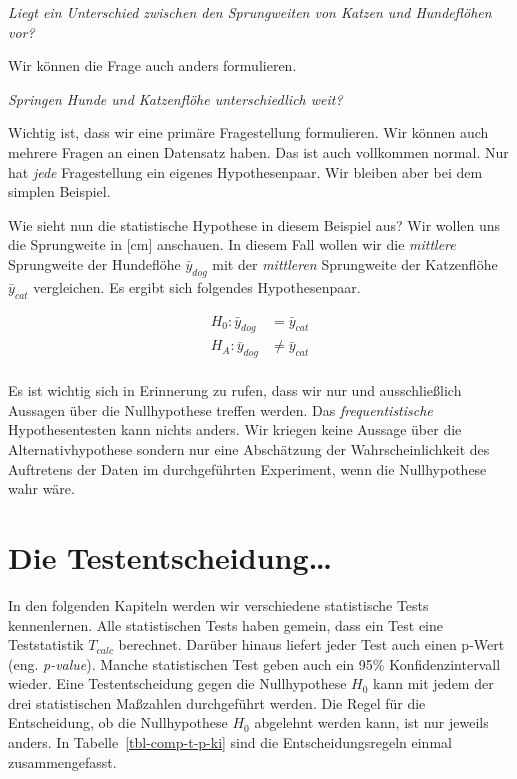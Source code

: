 \documentclass[
  letterpaper,
]{scrbook}
\begin{document}
\emph{Liegt ein Unterschied zwischen den Sprungweiten von Katzen und
Hundeflöhen vor?}

Wir können die Frage auch anders formulieren.

\emph{Springen Hunde und Katzenflöhe unterschiedlich weit?}

Wichtig ist, dass wir eine primäre Fragestellung formulieren. Wir können
auch mehrere Fragen an einen Datensatz haben. Das ist auch vollkommen
normal. Nur hat \emph{jede} Fragestellung ein eigenes Hypothesenpaar.
Wir bleiben aber bei dem simplen Beispiel.

Wie sieht nun die statistische Hypothese in diesem Beispiel aus? Wir
wollen uns die Sprungweite in {[}cm{]} anschauen. In diesem Fall wollen
wir die \emph{mittlere} Sprungweite der Hundeflöhe \(\bar{y}_{dog}\) mit
der \emph{mittleren} Sprungweite der Katzenflöhe \(\bar{y}_{cat}\)
vergleichen. Es ergibt sich folgendes Hypothesenpaar.

\begin{align*} 
H_0: \bar{y}_{dog} &= \bar{y}_{cat} \\  
H_A: \bar{y}_{dog} &\neq \bar{y}_{cat} \\   
\end{align*}

{}

Es ist wichtig sich in Erinnerung zu rufen, dass wir nur und
ausschließlich Aussagen über die Nullhypothese treffen werden. Das
\emph{frequentistische} Hypothesentesten kann nichts anders. Wir kriegen
keine Aussage über die Alternativhypothese sondern nur eine Abschätzung
der Wahrscheinlichkeit des Auftretens der Daten im durchgeführten
Experiment, wenn die Nullhypothese wahr wäre.

\hypertarget{die-testentscheidung}{%
\section{Die Testentscheidung\ldots{}}\label{die-testentscheidung}}

In den folgenden Kapiteln werden wir verschiedene statistische Tests
kennenlernen. Alle statistischen Tests haben gemein, dass ein Test eine
Teststatistik \(T_{calc}\) berechnet. Darüber hinaus liefert jeder Test
auch einen p-Wert (eng. \emph{p-value}). Manche statistischen Test geben
auch ein 95\% Konfidenzintervall wieder. Eine Testentscheidung gegen die
Nullhypothese \(H_0\) kann mit jedem der drei statistischen Maßzahlen
durchgeführt werden. Die Regel für die Entscheidung, ob die
Nullhypothese \(H_0\) abgelehnt werden kann, ist nur jeweils anders. In
Tabelle~\ref{tbl-comp-t-p-ki} sind die Entscheidungsregeln einmal
zusammengefasst.
\end{document}
